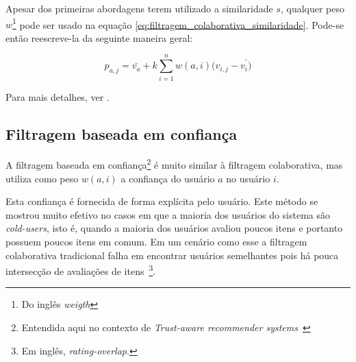 Apesar dos primeiras abordagens terem utilizado a similaridade $s$, qualquer peso $w$\footnote{Do inglês \textit{weigth}} pode ser usado na equação \ref{eq:filtragem_colaborativa_similaridade}. Pode-se então reescreve-la da seguinte maneira geral:

\begin{equation}
 p_{a,j} = \bar{v_{a}} + k\sum_{i=1}^n{w(a,i) (v_{i,j} - \bar{v_{i})}}
 \label{eq:filtragem_colaborativa_geral} 
\end{equation}

Para mais detalhes, ver \cite{Breese98}.


\subsection{Filtragem baseada em confiança} %

A filtragem baseada em confiança\footnote{Entendida aqui no contexto de \textit{Trust-aware recommender systems}~\cite{Massa07}} é muito similar à filtragem colaborativa, mas utiliza como peso $w(a,i)$ a confiança do usuário $a$ no usuário $i$.

Esta confiança é fornecida de forma explícita pelo usuário. Este método se mostrou muito efetivo no casos em que a maioria dos usuários do sistema são \textit{cold-users}, isto é, quando a maioria dos usuários avaliou poucos itens e portanto possuem poucos itens em comum. Em um cenário como esse a filtragem colaborativa tradicional falha em encontrar usuários semelhantes pois há pouca intersecção de avaliações de itens~\footnote{Em inglês, \textit{rating-overlap}.}.




